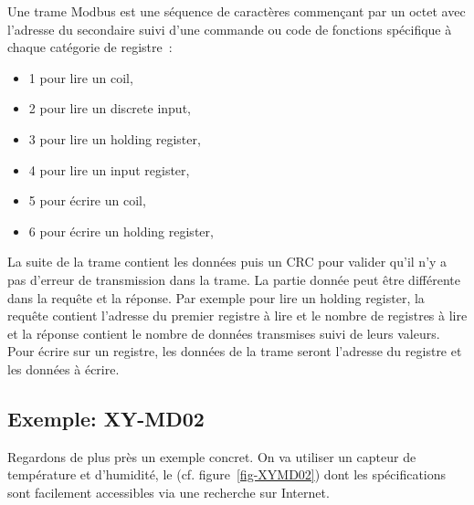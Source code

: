  

Une trame Modbus est une séquence de caractères commençant par un octet avec l'adresse du secondaire suivi d'une commande ou code de fonctions spécifique à chaque catégorie de registre~:
\begin{itemize}
    \item 1 pour lire un coil,
    \item 2 pour lire un discrete input,
    \item 3 pour lire un holding register,
    \item 4 pour lire un input register,
    \item 5 pour écrire un coil,
    \item 6 pour écrire un holding register,
\end{itemize}

    \vspace{1em}

La suite de la trame contient les données puis un \ac{CRC} pour valider qu'il n'y a pas d'erreur de transmission dans la trame. La partie donnée peut être différente dans la requête et la réponse. Par exemple pour lire un holding register, la requête contient l'adresse du premier registre à lire et le nombre de registres à lire et la réponse contient le nombre de données transmises suivi de leurs valeurs. Pour écrire sur un registre, les données de la trame seront l'adresse du registre et les données à écrire.

\subsection{Exemple: XY-MD02}


Regardons de plus près un exemple concret. On va utiliser un capteur de température et d'humidité, le  (cf. figure~\vref{fig-XYMD02}) dont les spécifications sont facilement accessibles via une recherche sur Internet. 

